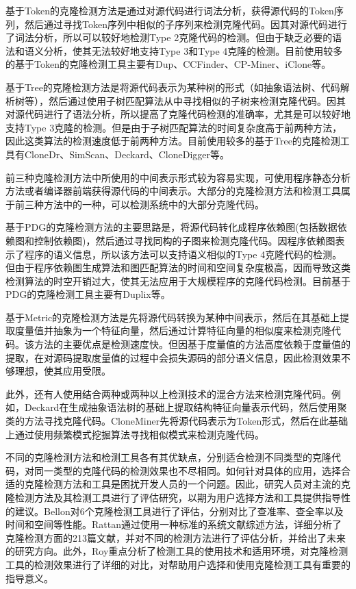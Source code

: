 基于Token的克隆检测方法是通过对源代码进行词法分析，获得源代码的Token序列，然后通过寻找Token序列中相似的子序列来检测克隆代码。因其对源代码进行了词法分析，所以可以较好地检测Type 2克隆代码的检测。但由于缺乏必要的语法和语义分析，使其无法较好地支持Type 3和Type 4克隆的检测。目前使用较多的基于Token的克隆检测工具主要有Dup\cite{baker1995finding}、CCFinder\cite{kamiya2002ccfinder}、CP-Miner\cite{li2006cp}、iClone\cite{gode2009incremental}等。

基于Tree的克隆检测方法是将源代码表示为某种树的形式（如抽象语法树、代码解析树等），然后通过使用子树匹配算法从中寻找相似的子树来检测克隆代码。因其对源代码进行了语法分析，所以提高了克隆代码检测的准确率，尤其是可以较好地支持Type 3克隆的检测。但是由于子树匹配算法的时间复杂度高于前两种方法，因此这类算法的检测速度低于前两种方法。目前使用较多的基于Tree的克隆检测工具有CloneDr\cite{baxter1998clone}、SimScan\cite{SimScan}、Deckard\cite{jiang2007deckard}、CloneDigger\cite{bulychev2008duplicate}等。

前三种克隆检测方法中所使用的中间表示形式较为容易实现，可使用程序静态分析方法或者编译器前端获得源代码的中间表示。大部分的克隆检测方法和检测工具属于前三种方法中的一种，可以检测系统中的大部分克隆代码。

基于PDG的克隆检测方法的主要思路是，将源代码转化成程序依赖图(包括数据依赖图和控制依赖图)，然后通过寻找同构的子图来检测克隆代码。因程序依赖图表示了程序的语义信息，所以该方法可以支持语义相似的Type 4克隆代码的检测。但由于程序依赖图生成算法和图匹配算法的时间和空间复杂度极高，因而导致这类检测算法的时空开销过大，使其无法应用于大规模程序的克隆代码检测。目前基于PDG的克隆检测工具主要有Duplix\cite{krinke2001identifying}等。

基于Metric的克隆检测方法是先将源代码转换为某种中间表示，然后在其基础上提取度量值并抽象为一个特征向量，然后通过计算特征向量的相似度来检测克隆代码。该方法的主要优点是检测速度快。但因基于度量值的方法高度依赖于度量值的提取，在对源码提取度量值的过程中会损失源码的部分语义信息，因此检测效果不够理想，使其应用受限。

此外，还有人使用结合两种或两种以上检测技术的混合方法来检测克隆代码。例如，Deckard在生成抽象语法树的基础上提取结构特征向量表示代码，然后使用聚类的方法寻找克隆代码\cite{jiang2007deckard}。CloneMiner先将源代码表示为Token形式，然后在此基础上通过使用频繁模式挖掘算法寻找相似模式来检测克隆代码\cite{basit2009data}。



不同的克隆检测方法和检测工具各有其优缺点，分别适合检测不同类型的克隆代码，对同一类型的克隆代码的检测效果也不尽相同。如何针对具体的应用，选择合适的克隆检测方法和工具是困扰开发人员的一个问题。因此，研究人员对主流的克隆检测方法及其检测工具进行了评估研究，以期为用户选择方法和工具提供指导性的建议。Bellon对6个克隆检测工具进行了评估，分别对比了查准率、查全率以及时间和空间等性能\cite{bellon2007comparison}。Rattan通过使用一种标准的系统文献综述方法，详细分析了克隆检测方面的213篇文献，并对不同的检测方法进行了评估分析，并给出了未来的研究方向\cite{rattan2013software}。此外，Roy重点分析了检测工具的使用技术和适用环境，对克隆检测工具的检测效果进行了详细的对比，对帮助用户选择和使用克隆检测工具有重要的指导意义\cite{roy2009comparison}\cite{svajlenko2014evaluating}。

